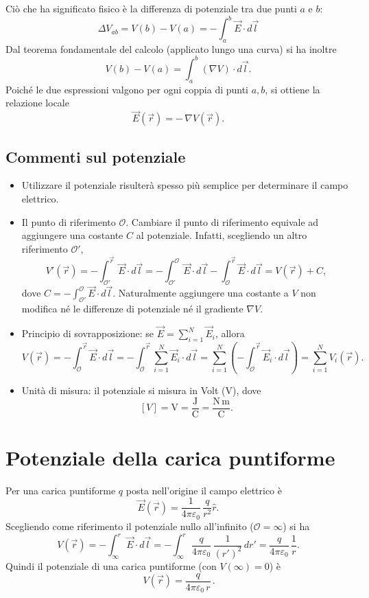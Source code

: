 \documentclass{book}
\begin{document}
Ciò che ha significato fisico è la differenza di potenziale tra due punti \(a\) e \(b\):
\[
\Delta V_{ab} = V(b)-V(a) = -\int_{a}^{b} \vec{E}\cdot d\vec{l}
\]
Dal teorema fondamentale del calcolo (applicato lungo una curva) si ha inoltre
\[
V(b)-V(a)=\int_{a}^{b} (\nabla V)\cdot d\vec{l}.
\]
Poiché le due espressioni valgono per ogni coppia di punti \(a,b\), si ottiene la relazione locale
\[
\boxed{\vec{E}(\vec r) = -\,\nabla V(\vec r).}
\]

\subsection*{Commenti sul potenziale}

\begin{itemize}
  \item Utilizzare il potenziale risulterà spesso più semplice per determinare il campo elettrico.
  \item Il punto di riferimento \(\mathcal{O}\). Cambiare il punto di riferimento equivale ad aggiungere una costante \(C\) al potenziale. Infatti, scegliendo un altro riferimento \(\mathcal{O}'\),
    \[
      V'(\vec{r}) = - \int_{\mathcal{O}'}^{\vec{r}} \vec{E}\cdot d\vec{l}
      = -\int_{\mathcal{O}'}^{\mathcal{O}} \vec{E}\cdot d\vec{l} -\int_{\mathcal{O}}^{\vec{r}} \vec{E}\cdot d\vec{l}
      = V(\vec{r}) + C,
    \]
    dove \(C = -\displaystyle\int_{\mathcal{O}'}^{\mathcal{O}} \vec{E}\cdot d\vec{l}\). Naturalmente aggiungere una costante a \(V\) non modifica né le differenze di potenziale né il gradiente \(\nabla V\).
  \item Principio di sovrapposizione: se \(\vec{E}=\sum_{i=1}^N \vec{E}_i\), allora
    \[
      V(\vec r) = -\int_{\mathcal{O}}^{\vec r} \vec{E}\cdot d\vec l
               = -\int_{\mathcal{O}}^{\vec r}\sum_{i=1}^N\vec{E}_i\cdot d\vec l
               = \sum_{i=1}^N \left(-\int_{\mathcal{O}}^{\vec r}\vec{E}_i\cdot d\vec l\right)
               = \sum_{i=1}^N V_i(\vec r).
    \]
  \item Unità di misura: il potenziale si misura in Volt (V), dove
    \[
      [V] = \mathrm{V} = \frac{\mathrm{J}}{\mathrm{C}} = \frac{\mathrm{N\,m}}{\mathrm{C}}.
    \]
\end{itemize}

\section{Potenziale della carica puntiforme}

Per una carica puntiforme \(q\) posta nell'origine il campo elettrico è
\[
\vec{E}(\vec r)=\frac{1}{4\pi\varepsilon_0}\,\frac{q}{r^{2}}\hat r.
\]
Scegliendo come riferimento il potenziale nullo all'infinito (\(\mathcal{O}=\infty\)) si ha
\[
V(\vec r)= -\int_{\infty}^{r} \vec{E}\cdot d\vec l
= -\int_{\infty}^{r} \frac{q}{4\pi\varepsilon_0}\,\frac{1}{(r')^{2}}\,dr'
= \frac{q}{4\pi\varepsilon_0}\,\frac{1}{r}.
\]
Quindi il potenziale di una carica puntiforme (con \(V(\infty)=0\)) è
\[
\boxed{\,V(\vec r)=\dfrac{q}{4\pi\varepsilon_0\,r}\,.}
\]
\end{document}
